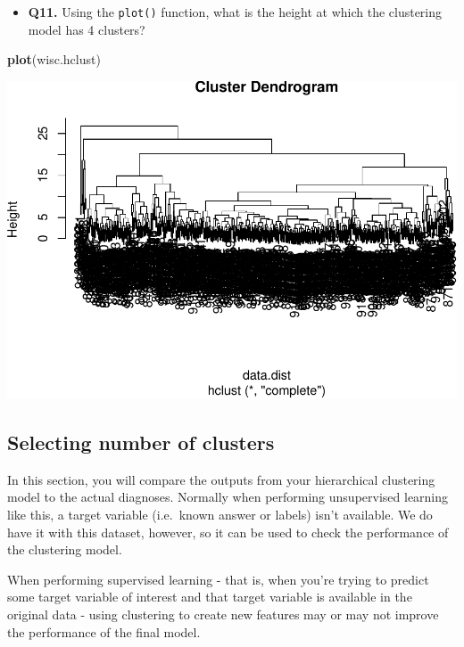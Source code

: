\documentclass[]{article}
\newenvironment{Shaded}{\begin{snugshade}}{\end{snugshade}}
\newcommand{\KeywordTok}[1]{\textcolor[rgb]{0.13,0.29,0.53}{\textbf{#1}}}
\newcommand{\NormalTok}[1]{#1}
\providecommand{\tightlist}{%
  \setlength{\itemsep}{0pt}\setlength{\parskip}{0pt}}
\begin{document}
\begin{itemize}
\tightlist
\item
  \textbf{Q11.} Using the \texttt{plot()} function, what is the height
  at which the clustering model has 4 clusters?
\end{itemize}

\begin{Shaded}
\begin{Highlighting}[]
\KeywordTok{plot}\NormalTok{(wisc.hclust)}
\end{Highlighting}
\end{Shaded}

\includegraphics{lecture9_lab_files/figure-latex/tree_dummy-1.pdf}

\subsection{Selecting number of
clusters}\label{selecting-number-of-clusters}

In this section, you will compare the outputs from your hierarchical
clustering model to the actual diagnoses. Normally when performing
unsupervised learning like this, a target variable (i.e.~known answer or
labels) isn't available. We do have it with this dataset, however, so it
can be used to check the performance of the clustering model.

When performing supervised learning - that is, when you're trying to
predict some target variable of interest and that target variable is
available in the original data - using clustering to create new features
may or may not improve the performance of the final model.
\end{document}
